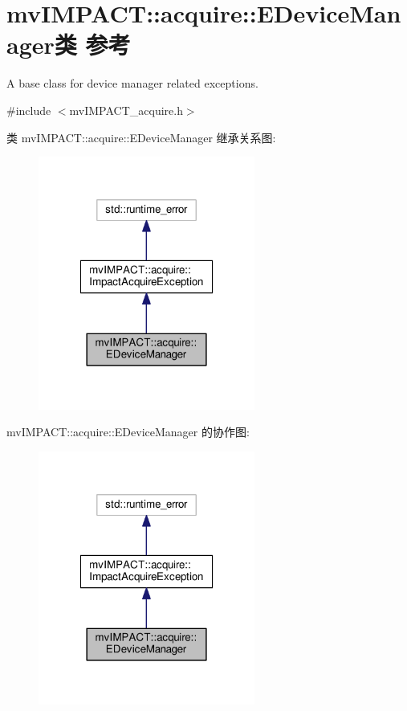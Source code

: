 \hypertarget{classmv_i_m_p_a_c_t_1_1acquire_1_1_e_device_manager}{\section{mv\+I\+M\+P\+A\+C\+T\+:\+:acquire\+:\+:E\+Device\+Manager类 参考}
\label{classmv_i_m_p_a_c_t_1_1acquire_1_1_e_device_manager}
}


A base class for device manager related exceptions.  




{\ttfamily \#include $<$mv\+I\+M\+P\+A\+C\+T\+\_\+acquire.\+h$>$}



类 mv\+I\+M\+P\+A\+C\+T\+:\+:acquire\+:\+:E\+Device\+Manager 继承关系图\+:
\nopagebreak
\begin{figure}[H]
\begin{center}
\leavevmode
\includegraphics[width=202pt]{classmv_i_m_p_a_c_t_1_1acquire_1_1_e_device_manager__inherit__graph}
\end{center}
\end{figure}


mv\+I\+M\+P\+A\+C\+T\+:\+:acquire\+:\+:E\+Device\+Manager 的协作图\+:
\nopagebreak
\begin{figure}[H]
\begin{center}
\leavevmode
\includegraphics[width=202pt]{classmv_i_m_p_a_c_t_1_1acquire_1_1_e_device_manager__coll__graph}
\end{center}
\end{figure}
